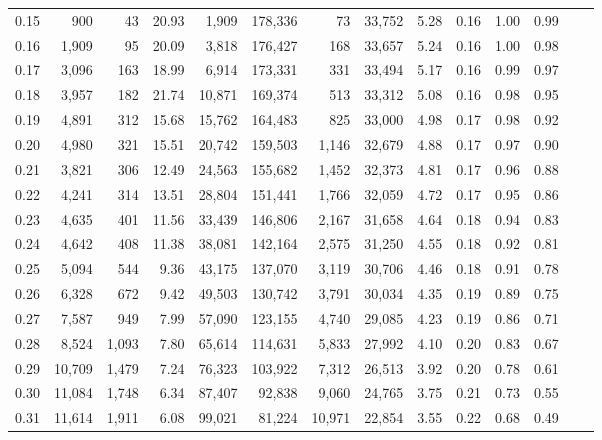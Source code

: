 \begin{tabular}{rrrrrrrrrrrrrr}
0.15 &     900 &     43 &   20.93 &    1,909 &  178,336 &      73 &  33,752 &  5.28 &  0.16 &  1.00 &      0.99 \\
0.16 &   1,909 &     95 &   20.09 &    3,818 &  176,427 &     168 &  33,657 &  5.24 &  0.16 &  1.00 &      0.98 \\
0.17 &   3,096 &    163 &   18.99 &    6,914 &  173,331 &     331 &  33,494 &  5.17 &  0.16 &  0.99 &      0.97 \\
0.18 &   3,957 &    182 &   21.74 &   10,871 &  169,374 &     513 &  33,312 &  5.08 &  0.16 &  0.98 &      0.95 \\
0.19 &   4,891 &    312 &   15.68 &   15,762 &  164,483 &     825 &  33,000 &  4.98 &  0.17 &  0.98 &      0.92 \\
0.20 &   4,980 &    321 &   15.51 &   20,742 &  159,503 &   1,146 &  32,679 &  4.88 &  0.17 &  0.97 &      0.90 \\
0.21 &   3,821 &    306 &   12.49 &   24,563 &  155,682 &   1,452 &  32,373 &  4.81 &  0.17 &  0.96 &      0.88 \\
0.22 &   4,241 &    314 &   13.51 &   28,804 &  151,441 &   1,766 &  32,059 &  4.72 &  0.17 &  0.95 &      0.86 \\
0.23 &   4,635 &    401 &   11.56 &   33,439 &  146,806 &   2,167 &  31,658 &  4.64 &  0.18 &  0.94 &      0.83 \\
0.24 &   4,642 &    408 &   11.38 &   38,081 &  142,164 &   2,575 &  31,250 &  4.55 &  0.18 &  0.92 &      0.81 \\
0.25 &   5,094 &    544 &    9.36 &   43,175 &  137,070 &   3,119 &  30,706 &  4.46 &  0.18 &  0.91 &      0.78 \\
0.26 &   6,328 &    672 &    9.42 &   49,503 &  130,742 &   3,791 &  30,034 &  4.35 &  0.19 &  0.89 &      0.75 \\
0.27 &   7,587 &    949 &    7.99 &   57,090 &  123,155 &   4,740 &  29,085 &  4.23 &  0.19 &  0.86 &      0.71 \\
0.28 &   8,524 &  1,093 &    7.80 &   65,614 &  114,631 &   5,833 &  27,992 &  4.10 &  0.20 &  0.83 &      0.67 \\
0.29 &  10,709 &  1,479 &    7.24 &   76,323 &  103,922 &   7,312 &  26,513 &  3.92 &  0.20 &  0.78 &      0.61 \\
0.30 &  11,084 &  1,748 &    6.34 &   87,407 &   92,838 &   9,060 &  24,765 &  3.75 &  0.21 &  0.73 &      0.55 \\
0.31 &  11,614 &  1,911 &    6.08 &   99,021 &   81,224 &  10,971 &  22,854 &  3.55 &  0.22 &  0.68 &      0.49 \\

\end{tabular}
